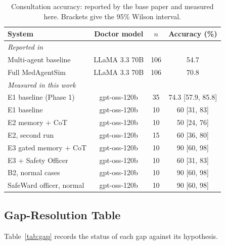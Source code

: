 \documentclass[conference]{IEEEtran}
\begin{document}
\begin{table}[t]
\caption{Consultation accuracy: reported by the base paper and measured here. Brackets give the 95\% Wilson interval.}
\label{tab:base}
\centering
\small
\setlength{\tabcolsep}{3pt}
\begin{tabular}{lccc}
\toprule
System & Doctor model & $n$ & Accuracy (\%) \\
\midrule
\multicolumn{4}{l}{\emph{Reported in~\cite{almansoori2025medagentsim}}} \\
Multi-agent baseline & LLaMA 3.3 70B & 106 & 54.7 \\
Full MedAgentSim & LLaMA 3.3 70B & 106 & 70.8 \\
\midrule
\multicolumn{4}{l}{\emph{Measured in this work}} \\
E1 baseline (Phase 1) & gpt-oss-120b & 35 & 74.3 [57.9, 85.8] \\
E1 baseline & gpt-oss-120b & 10 & 60 [31, 83] \\
E2 memory + CoT & gpt-oss-120b & 10 & 50 [24, 76] \\
E2, second run & gpt-oss-120b & 15 & 60 [36, 80] \\
E3 gated memory + CoT & gpt-oss-120b & 10 & 90 [60, 98] \\
E3 + Safety Officer & gpt-oss-120b & 10 & 60 [31, 83] \\
B2, normal cases & gpt-oss-120b & 10 & 90 [60, 98] \\
SafeWard officer, normal & gpt-oss-120b & 10 & 90 [60, 98] \\
\bottomrule
\end{tabular}
\end{table}

\subsection{Gap-Resolution Table}
Table~\ref{tab:gap} records the status of each gap against its hypothesis.
\end{document}
